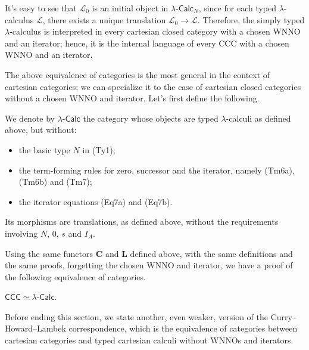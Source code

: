 \begin{remark}
    It's easy to see that $\mathcal L_0$ is an initial object in $\lambda\text{-}\mathsf{Calc}_N$, since for each typed $\lambda$-calculus $\mathcal L$, there exists a unique translation $\mathcal L_0 \to \mathcal L$.
    Therefore, the simply typed $\lambda$-calculus is interpreted in every cartesian closed category with a chosen WNNO and an iterator; hence, it is the internal language of every CCC with a chosen WNNO and an iterator.
\end{remark}

The above equivalence of categories is the most general in the context of cartesian categories; we can specialize it to the case of cartesian closed categories without a chosen WNNO and iterator.
Let's first define the following.

\begin{definition}\label{idx:lambda-calc}
    We denote by $\lambda\text{-}\mathsf{Calc}$ the category whose objects are typed $\lambda$-calculi as defined above, but without:
    \begin{itemize}
        \item the basic type $N$ in (Ty1);
        \item the term-forming rules for zero, successor and the iterator, namely (Tm6a), (Tm6b) and (Tm7);
        \item the iterator equations (Eq7a) and (Eq7b).
    \end{itemize}
    Its morphisms are translations, as defined above, without the requirements involving $N$, $0$, $s$ and $I_A$.
\end{definition}

Using the same functors $\mathbf C$ and $\mathbf L$ defined above, with the same definitions and the same proofs, forgetting
the chosen WNNO and iterator, we have a proof of the following equivalence of categories.

\begin{theorem}\label{thm:curry-howard-lambek-without-wnno-and-iterator}
    \leavevmode\newline
    $\mathsf{CCC} \simeq \lambda\text{-}\mathsf{Calc}$.
\end{theorem}

Before ending this section, we state another, even weaker, version of the Curry--Howard--Lambek correspondence, which is the equivalence of categories between cartesian categories and typed cartesian calculi without WNNOs and iterators.

